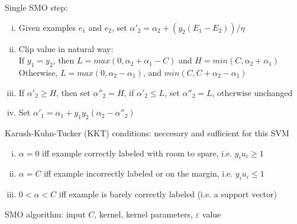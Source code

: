 \documentclass{article}
\begin{document}
			Single SMO step:
			\begin{enumerate}[(i)]
				\item Given examples $e_1$ and $e_2$, set $\alpha'_2 = \alpha_2 + (y_2(E_1 - E_2))/\eta$
				\item Clip value in natural way: \\
				If $y_1 = y_2$, then $L = max(0, \alpha_2 + \alpha_1 - C)$ and $H = min(C, \alpha_2 + \alpha_1)$ \\
				Otherwise, $L = max(0, \alpha_2 - \alpha_1)$, and $min(C, C + \alpha_2 - \alpha_1)$
				\item If $\alpha'_2 \geq H$, then set $\alpha''_2 = H$, if $\alpha'_2 \leq L$, set $\alpha''_2 = L$, otherwise unchanged
				\item Set $\alpha'_1 = \alpha_1 + y_1y_2(\alpha_2 - \alpha''_2)$
				\end{enumerate}
			Karush-Kuhn-Tucker (KKT) conditions: neccesary and sufficient for this SVM
			\begin{enumerate}[(i)]
				\item $\alpha = 0$ iff example correctly labeled with room to spare, i.e. $y_iu_i \geq 1$
				\item $\alpha = C$ iff example incorrectly labeled or on the margin, i.e. $y_iu_i \leq 1$
				\item $0 < \alpha < C$ iff example is barely correctly labeled (i.e. a support vector)
				\end{enumerate}
			SMO algorithm: input $C$, kernel, kernel parameters, $\varepsilon$ value
\end{document}
